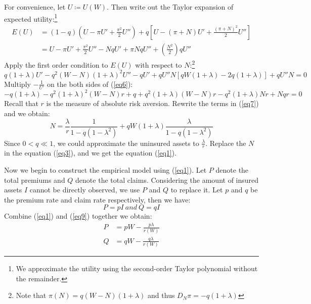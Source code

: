 \documentclass[11pt, a4paper, leqno]{article}
\begin{document}
For convenience, let $U\coloneqq U(W)$. Then write out the Taylor expansion of expected utility:\footnote{We approximate the utility using the second-order Taylor polynomial without the remainder.}
\begin{equation}
\begin{aligned}
E(U)&=(1-q)(U-\pi U'+\frac{\pi^{2}}{2}U'')+q[U-(\pi +N)U'+\frac{(\pi+N)^{2}}{2}U'']\\
    &=U-\pi U'+\frac{\pi^{2}}{2}U''-NqU'+\pi NqU''+(\frac{N^{2}}{2})qU''
\end{aligned}
\end{equation}
Apply the first order condition to $E(U)$ with respect to $N$:\footnote{Note that $\pi(N)=q(W-N)(1+\lambda)$ and thus $D_{N}\pi=-q(1+\lambda)$}
\begin{equation}\label{eq6}
q(1+\lambda)U'-q^{2}(W-N)(1+\lambda)^{2}U''-qU'+qU''N[qW(1+\lambda)-2q(1+\lambda)]+qU''N=0
\end{equation}
Multiply $-\frac{1}{U'}$ on the both sides of (\ref{eq6}):
\begin{equation}\label{eq7}
-q(1+\lambda)-q^{2}(1+\lambda)^{2}(W-N)r+q+q^{2}(1+\lambda)(W-N)r-q^{2}(1+\lambda)Nr+Nqr=0
\end{equation}
Recall that $r$ is the measure of absolute risk aversion. Rewrite the terms in (\ref{eq7}) and we obtain:
\begin{equation}
N=\frac{\lambda}{r}\frac{1}{1-q(1-\lambda^{2})}+qW(1+\lambda)\frac{\lambda}{1-q(1-\lambda^{2})}
\end{equation}
Since $0<q\ll1$, we could approximate the uninsured assets to $\frac{\lambda}{r}$. Replace the $N$ in the equation (\ref{eq3}), and we get the equation (\ref{eq1}).

Now we begin to construct the empirical model using (\ref{eq1}). Let $P$ denote the total premiums and $Q$ denote the total claims. Considering the amount of insured assets $I$ cannot be directly observed, we use $P$ and $Q$ to replace it. Let $p$ and $q$ be the premium rate and claim rate respectively, then we have:
\begin{equation}\label{eq9}
P=pI\ and\ Q=qI
\end{equation}
Combine (\ref{eq1}) and (\ref{eq9}) together we obtain:
\begin{equation}\label{eq10}
\begin{aligned}
P&=pW-\frac{p\lambda}{r(W)}\\
Q&=qW-\frac{q\lambda}{r(W)}
\end{aligned}
\end{equation}
\end{document}
